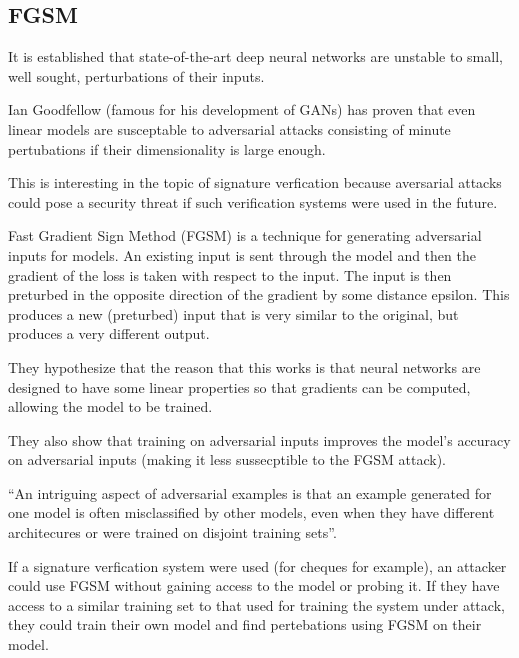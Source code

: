 \subsection{FGSM}\label{sec:fgsm}

It is established that state-of-the-art deep neural networks are unstable to small, well sought, perturbations of their inputs\cite{deep_fool}.

Ian Goodfellow (famous for his development of GANs) has proven that even linear models are susceptable to adversarial attacks consisting of minute pertubations if their dimensionality is large enough\cite{goodfellow}.

This is interesting in the topic of signature verfication because aversarial attacks could pose a security threat if such verification systems were used in the future.

Fast Gradient Sign Method (FGSM) is a technique for generating adversarial inputs for models.
An existing input is sent through the model and then the gradient of the loss is taken with respect to the input.
The input is then preturbed in the opposite direction of the gradient by some distance epsilon.
This produces a new (preturbed) input that is very similar to the original, but produces a very different output.

They hypothesize that the reason that this works is that neural networks are designed to have some linear properties so that gradients can be computed, allowing the model to be trained\cite{goodfellow}. 

They also show that training on adversarial inputs improves the model's accuracy on adversarial inputs (making it less sussecptible to the FGSM attack).

``An intriguing aspect of adversarial examples is that an example generated for one model is often
misclassified by other models, even when they have different architecures or were trained on disjoint training sets''\cite{goodfellow}.

If a signature verfication system were used (for cheques for example), an attacker could use FGSM without gaining access to the model or probing it.
If they have access to a similar training set to that used for training the system under attack, they could train their own model and find pertebations using FGSM on their model.

